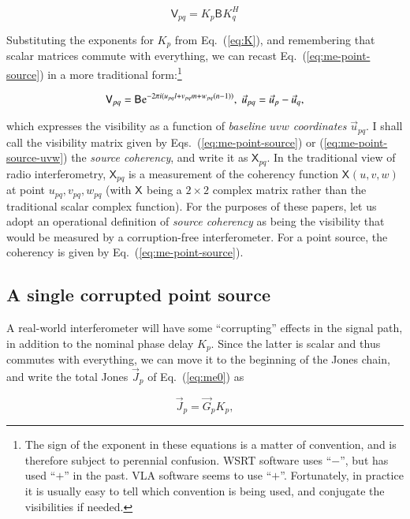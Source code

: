\documentclass{aa}
\newcommand{\herm}{H}
\newcommand{\jones}[2]{\vec {#1}_{#2}}
\newcommand{\coh}[2]{\mathsf{{#1}}_{{#2}}}
\begin{document}
  \begin{equation}\label{eq:me-point-source}
  \coh{V}{pq} = K_p \coh{B}{}  K^\herm_q
  \end{equation}

Substituting the exponents for $K_p$ from Eq.~(\ref{eq:K}), and remembering that scalar matrices commute with everything, we can recast Eq.~(\ref{eq:me-point-source}) in a more traditional form:\footnote{The sign of the exponent in these equations is a matter of convention, and is therefore subject to perennial confusion. WSRT software uses ``$-$'', but has used ``$+$'' in the past. VLA software seems to use ``$+$''. Fortunately, in practice it is usually easy to tell which convention is being used, and conjugate the visibilities if needed.}

  \begin{equation}\label{eq:me-point-source-uvw}
  \coh{V}{pq} = \coh{B}{}  {\rm e}^{-2\pi i(u_{pq} l+v_{pq} m+w_{pq} (n-1))},\;\vec u_{pq} = \vec u_p - \vec u_q,
  \end{equation}
 
which expresses the visibility as a function of {\em baseline $uvw$ coordinates} $\vec u_{pq}$. I shall call the visibility matrix given by Eqs.~(\ref{eq:me-point-source}) or (\ref{eq:me-point-source-uvw}) the {\em source coherency}, and write it as $\coh{X}{pq}$. In the traditional view of radio interferometry, $\coh{X}{pq}$ is a measurement of the coherency function $\coh{X}{}(u,v,w)$ at point $u_{pq},v_{pq},w_{pq}$ (with $\coh{X}{}$ being a $2\times2$ complex matrix rather than the traditional scalar complex function). For the purposes of these papers, let us adopt an operational definition of {\em source coherency} as being the visibility that would be measured by a corruption-free interferometer. For a point source, the coherency is given by Eq.~(\ref{eq:me-point-source}).

\subsection{A single corrupted point source}

A real-world interferometer will have some ``corrupting'' effects in the signal path, in addition to the nominal phase delay $K_p$. Since the latter is scalar and thus commutes with everything, we can move it to the beginning of the Jones chain, and write the total Jones $\jones{J}{p}$ of Eq.~(\ref{eq:me0}) as

\[
\jones{J}{p} = \jones{G}{p} K_p,
\]
\end{document}
